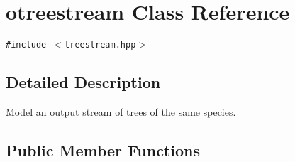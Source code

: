 \hypertarget{classotreestream}{
\section{otreestream Class Reference}
\label{classotreestream}
}
{\tt \#include $<$treestream.hpp$>$}



\subsection{Detailed Description}
Model an output stream of trees of the same species. 

\subsection*{Public Member Functions}
